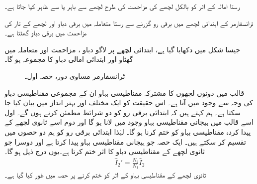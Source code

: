 رستا امالہ کے اثر کو بالکل لچھے کی مزاحمت کی طرح لچھے سے باہر   یا    سے ظاہر کیا جاتا ہے۔

ٹرانسفارمر کے ابتدائی لچھے میں برقی رو   گزرنے سے رستا متعاملہ میں  برقی دباو اور لچھے کے تار کی مزاحمت  میں  برقی دباو گھٹتا ہے۔

جیسا شکل   میں دکھایا گیا ہے، ابتدائی لچھے  پر لاگو دباو ،   مزاحمت  اور متعاملہ    میں گھٹاو اور  ابتدائی امالی دباو  کا مجموعہ  ہو گا۔  
\begin{figure}
\centering
\caption{ٹرانسفارمر مساوی دور، حصہ اول۔}
\label{شکل_ٹرانسفارمر_ماڈل_حصہ_اول}
\end{figure}
%

قالب میں دونوں لچھوں کا مشترکہ مقناطیسی بہاو ان کے مجموعی مقناطیسی دباو کی وجہ سے وجود میں آتا ہے۔ اس حقیقت  کو ایک مختلف اور بہتر انداز میں بیان کیا جا سکتا ہے۔ ہم کہتے ہیں کہ ابتدائی برقی رو کو دو شرائط مطمئن کرنے ہوں گے۔ اول اسے قالب میں ہیجانی مقناطیسی بہاو وجود میں لانا ہو گا اور دوم اسے ثانوی لچھے کے پیدا کردہ مقناطیسی بہاو کو ختم کرنا ہو گا۔ لہٰذا ابتدائی برقی رو کو ہم دو حصوں میں تقسیم کر سکتے ہیں۔ ایک حصہ  جو ہیجانی مقناطیسی بہاو پیدا کرتا ہے اور دوسرا  جو ثانوی لچھے کے مقناطیسی دباو کا اثر  ختم کرتا ہے۔یوں  درج ذیل ہو گا۔
\begin{align}
\hat{I}_2'=\frac{N_2}{N_1} \hat{I}_2
\end{align}
 ثانوی لچھے کے مقناطیسی بہاو کے اثر کو ختم کرنے پر حصہ   میں غور کیا گیا ہے۔

